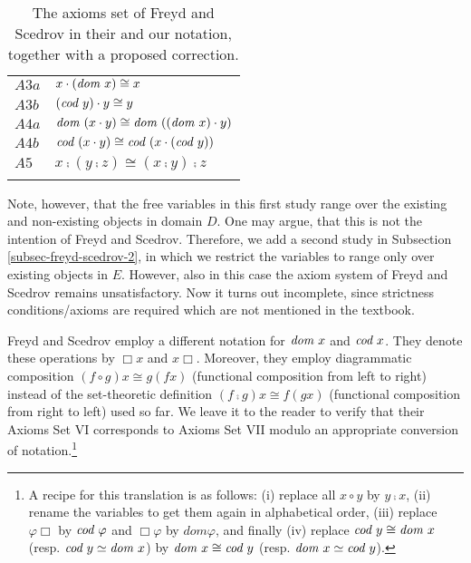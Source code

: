 \begin{table}
\begin{tabular}{ll}
  $A3a$  & $x \cdot (\textit{dom \/} x) \cong x$ \\ 
  $A3b$ & $(\textit{cod \/} y) \cdot y \cong y$ \\
  $A4a$ & $\textit{dom \/}(x \cdot y) \cong \textit{dom \/}((\textit{dom \/} x) \cdot y)$ \\ 
  $A4b$ & $\textit{cod \/}(x \cdot y) \cong \textit{cod \/}(x \cdot (\textit{cod \/} y))$ \\ 
  $A5$   & $x \comp (y \comp z) \cong  (x \comp y) \comp z$   \\
\\
\hline
\end{tabular}
\caption{The axioms set of Freyd and Scedrov in their and our
  notation, together with a proposed correction.\label{axioms-sets-2}}
\end{table}


 Note, however, that the free variables in this first study range over
 the existing and non-existing objects in domain $D$. One may argue,
 that this is not the intention of Freyd and
 Scedrov. Therefore, we add a second study in Subsection
 \ref{subsec-freyd-scedrov-2}, in which we restrict the
 variables to range only over existing objects in $E$. However, also in this case
 the axiom system of Freyd and Scedrov remains unsatisfactory. Now it
 turns out incomplete, 
 since strictness conditions/axioms are required which are not mentioned in
 the textbook.

  Freyd and Scedrov employ a different notation for $\textit{dom \/} x$ and $\textit{cod \/}
 x$. They denote these operations by $\Box x$ 
  and $x\Box$. Moreover, they employ diagrammatic composition $(f \circ
  g) x \cong g(f x)$ (functional composition from left to right) instead of the set-theoretic 
  definition $(f \comp g) x \cong f(g x)$ (functional composition from right to left) used so far.
  We leave it to the reader to verify that their Axioms
  Set VI corresponds to Axioms
  Set VII modulo an appropriate conversion of notation.\footnote{A recipe for 
  this translation is as follows: (i) replace all $x \circ y$ by
  $y \comp x$, (ii) rename the variables to get them again in alphabetical order,
(iii) replace $\varphi\Box$ by $\textit{cod \/} \varphi$ and $\Box\varphi$  by $dom \varphi$, and finally
(iv) replace $\textit{cod \/} y \cong \textit{dom \/} x$ (resp. $\textit{cod \/} y \simeq \textit{dom \/} x$) 
   by $\textit{dom \/} x \cong \textit{cod \/} y$ (resp. $\textit{dom \/} x \simeq \textit{cod \/} y$).}

